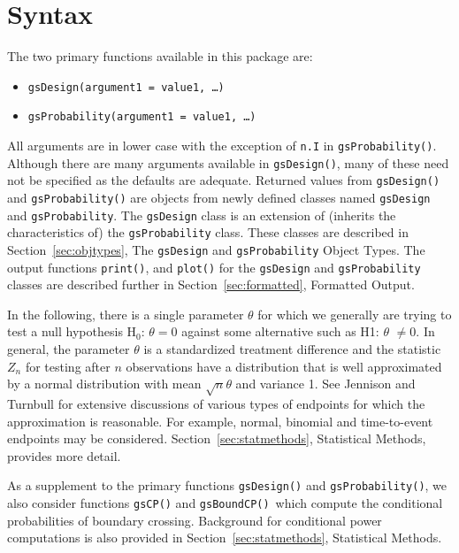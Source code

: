 \section{Syntax}

The two primary functions available in this package are:

\begin{itemize}
\item \texttt{gsDesign(argument1 = value1, \ldots)}

\item \texttt{gsProbability(argument1 = value1, \ldots)}
\end{itemize}

All arguments are in lower case with the exception of \texttt{n.I} in
\texttt{gsProbability()}. Although there are many arguments available in
\texttt{gsDesign()}, many of these need not be specified as the defaults are adequate. Returned values from \texttt{gsDesign()} and
\texttt{gsProbability()} are objects from newly defined classes named 
\texttt{gsDesign} and \texttt{gsProbability}. The \texttt{gsDesign} class is 
an extension of (inherits the characteristics of) the \texttt{gsProbability} 
class. These classes are described in
Section~\ref{sec:objtypes}, The \texttt{gsDesign} and \texttt{gsProbability} 
Object Types. The output functions \texttt{print()}, and \texttt{plot()} 
for the \texttt{gsDesign} and \texttt{gsProbability} classes are described 
further in Section~\ref{sec:formatted}, Formatted Output.

In the following, there is a single parameter $\theta$ for which we generally
are trying to test a null hypothesis H$_{0}$: $\theta=0$ against some
alternative such as H1: $\theta$ $\neq0$. In general, the parameter $\theta$
is a standardized treatment difference and the statistic $Z_{n}$
for testing after $n$ observations have a distribution that is well
approximated by a normal distribution with mean $\sqrt{n}\theta$ and variance
1. See Jennison and Turnbull \cite{JTBook} for extensive discussions of
various types of endpoints for which the approximation is reasonable. For
example, normal, binomial and time-to-event endpoints may be considered.
Section~\ref{sec:statmethods}, Statistical Methods, provides more detail.

As a supplement to the primary functions \texttt{gsDesign()} and
\texttt{gsProbability()}, we also consider functions \texttt{gsCP()} and
\texttt{gsBoundCP()}\ which compute the conditional probabilities of boundary
crossing. Background for conditional power computations is also provided in 
Section~\ref{sec:statmethods}, Statistical Methods.

